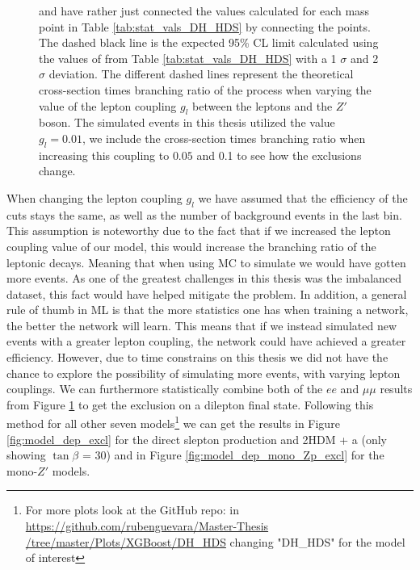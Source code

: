 \documentclass[12pt, a4paper]{book}
\begin{document}
\begin{figure}[!ht]
{   and have rather just connected the values calculated for each mass point in Table \ref{tab:stat_vals_DH_HDS} by connecting the points. The dashed black line is the expected 95\% CL limit calculated using the values of from Table \ref{tab:stat_vals_DH_HDS} with a 1 $\sigma$ and 2 $\sigma$ deviation. 
   The different dashed lines represent the theoretical cross-section times branching ratio of the process when varying the value of the lepton coupling $g_l$ between the leptons and the $Z'$ boson. The simulated events in this thesis utilized the value $g_l=0.01$, we include the cross-section times branching ratio when increasing this coupling to $0.05$ and 0.1 to see how the exclusions change.  }\label{fig:DH_HDS_exclusion_ee_uu}
\end{figure}
\noindent When changing the lepton coupling $g_l$ we have assumed that the efficiency of the cuts stays the same, as well as the number of background events in the last bin. This assumption is noteworthy due to the fact that if we increased the lepton coupling value of our model, this would increase the branching ratio 
of the leptonic decays. Meaning that when using MC to simulate we would have gotten more events. As one of the greatest challenges in this thesis was the imbalanced dataset, this fact would have helped mitigate the problem. 
In addition, a general rule of thumb in ML is that the more statistics one has when training a network, the better the network will learn. 
This means that if we instead simulated new events with a greater lepton coupling, the network could have achieved a greater efficiency. However, due to time constrains on this thesis we did not have the chance to explore the possibility of simulating more events, with varying lepton couplings.
\clearpage\noindent We can furthermore statistically combine both of the $ee$ and $\mu\mu$ results from Figure \ref{fig:DH_HDS_exclusion_ee_uu} to get the exclusion on a dilepton final state. Following this method for all other seven models\footnote{For more plots look at the GitHub repo: in \href{https://github.com/rubenguevara/Master-Thesis/tree/master/Plots/XGBoost/DH_HDS}{https://github.com/rubenguevara/Master-Thesis\\/tree/master/Plots/XGBoost/DH\_HDS} changing "DH\_HDS" for the model of interest} 
we can get the results in Figure \ref{fig:model_dep_excl} for the direct slepton production and 2HDM + a (only showing $\tan\beta$ = 30) and in Figure \ref{fig:model_dep_mono_Zp_excl} for the mono-$Z'$ models.
\end{document}

